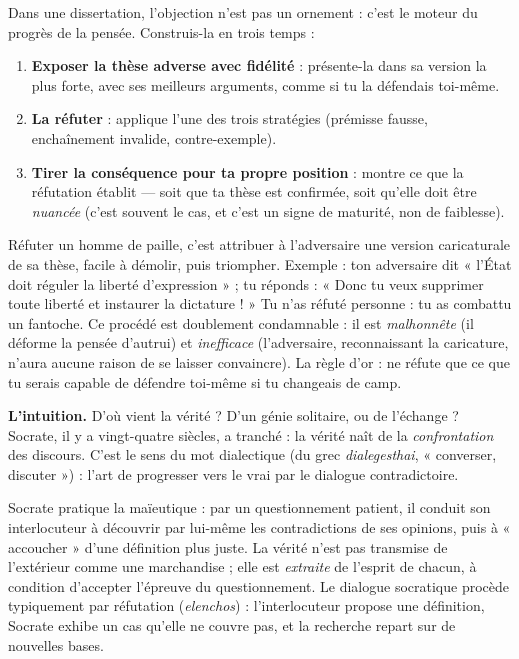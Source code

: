\documentclass[11pt]{article}
\newcommand{\cle}[1]{{\popxbold\color{popdark}#1}}
\newcounter{popsec}
\newcounter{popsub}
\newcommand{\courssub}[1]{%
  \stepcounter{popsub}%
  \par\vspace{9pt}\noindent{\popxbold\fontsize{11.5}{13}\selectfont\color{popink}{\color{poporange}\thepopsec.\thepopsub}\hspace{6pt}#1}\par\nopagebreak\vspace{4pt}
}
\begin{document}
\begin{methode}
Dans une dissertation, l'objection n'est pas un ornement : c'est le moteur du progrès de la pensée. Construis-la en trois temps :
\begin{enumerate}
\item \textbf{Exposer la thèse adverse avec fidélité} : présente-la dans sa version la plus forte, avec ses meilleurs arguments, comme si tu la défendais toi-même.
\item \textbf{La réfuter} : applique l'une des trois stratégies (prémisse fausse, enchaînement invalide, contre-exemple).
\item \textbf{Tirer la conséquence pour ta propre position} : montre ce que la réfutation établit — soit que ta thèse est confirmée, soit qu'elle doit être \emph{nuancée} (c'est souvent le cas, et c'est un signe de maturité, non de faiblesse).
\end{enumerate}
\end{methode}

\begin{attention}
Réfuter un \cle{homme de paille}, c'est attribuer à l'adversaire une version caricaturale de sa thèse, facile à démolir, puis triompher. Exemple : ton adversaire dit « l'État doit réguler la liberté d'expression » ; tu réponds : « Donc tu veux supprimer toute liberté et instaurer la dictature ! » Tu n'as réfuté personne : tu as combattu un fantoche. Ce procédé est doublement condamnable : il est \emph{malhonnête} (il déforme la pensée d'autrui) et \emph{inefficace} (l'adversaire, reconnaissant la caricature, n'aura aucune raison de se laisser convaincre). La règle d'or : ne réfute que ce que tu serais capable de défendre toi-même si tu changeais de camp.
\end{attention}

\courssub{La dialectique : de Socrate à Hegel}

\textbf{L'intuition.} D'où vient la vérité ? D'un génie solitaire, ou de l'échange ? Socrate, il y a vingt-quatre siècles, a tranché : la vérité naît de la \emph{confrontation} des discours. C'est le sens du mot \cle{dialectique} (du grec \emph{dialegesthai}, « converser, discuter ») : l'art de progresser vers le vrai par le dialogue contradictoire.

\begin{propriete}
Socrate pratique la \cle{maïeutique} : par un questionnement patient, il conduit son interlocuteur à découvrir par lui-même les contradictions de ses opinions, puis à « accoucher » d'une définition plus juste. La vérité n'est pas transmise de l'extérieur comme une marchandise ; elle est \emph{extraite} de l'esprit de chacun, à condition d'accepter l'épreuve du questionnement. Le dialogue socratique procède typiquement par réfutation (\emph{elenchos}) : l'interlocuteur propose une définition, Socrate exhibe un cas qu'elle ne couvre pas, et la recherche repart sur de nouvelles bases.
\end{propriete}
\end{document}
